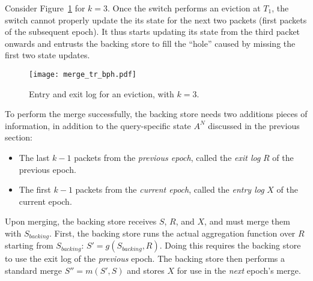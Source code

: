 Consider Figure~\ref{fig:bph-merge} for $k = 3$. Once the switch performs an eviction at $T_1$,
the switch cannot properly update the its state for the next two packets (first packets of the subsequent epoch).
It thus starts updating its state from the third packet onwards and entrusts the backing store to
fill the ``hole'' caused by missing the first two state updates.

\begin{figure}[h]
\centering
\texttt{[image: merge\_tr\_bph.pdf]}
\caption{Entry and exit log for an eviction, with $k = 3$.}
\label{fig:bph-merge}
\end{figure}

To perform the merge successfully,
the backing
store needs two additions pieces of information, 
in addition to the query-specific state $A^N$ discussed in the previous section:
\begin{itemize}
\item The last $k-1$ packets from the \emph{previous epoch}, called the \emph{exit log} $R$ of the previous epoch.
\item The first $k-1$ packets from the \emph{current epoch}, called the \emph{entry log} $X$ of the current epoch. 
\end{itemize}

Upon merging, the backing store receives $S$, $R$, and $X$, and must merge them with $S_{backing}$. First, the backing store runs the actual aggregation function over $R$ starting from $S_{backing}$: $S' = g(S_{backing}, R)$. Doing this requires the backing store to use the exit log of the \emph{previous} epoch. The backing store then performs a standard merge
 $S'' = m(S', S)$ and stores $X$ for use in the \emph{next} epoch's merge.

